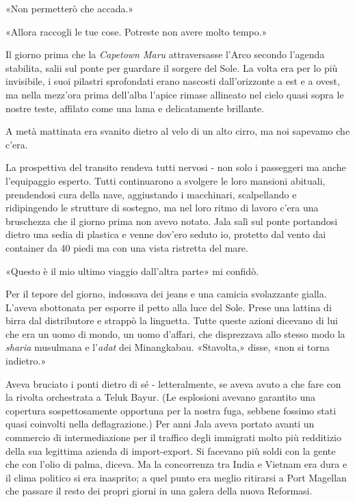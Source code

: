 «Non permetterò che accada.»

«Allora raccogli le tue cose. Potreste non avere molto tempo.»

\separatorefiori

Il giorno prima che la \emph{Capetown Maru} attraversasse l'Arco secondo
l'agenda stabilita, salii sul ponte per guardare il sorgere del Sole. La
volta era per lo più invisibile, i suoi pilastri sprofondati erano
nascosti dall'orizzonte a est e a ovest, ma nella mezz'ora prima
dell'alba l'apice rimase allineato nel cielo quasi sopra le nostre
teste, affilato come una lama e delicatamente brillante.

A metà mattinata era svanito dietro al velo di un alto cirro, ma noi
sapevamo che c'era.

La prospettiva del transito rendeva tutti nervosi - non solo i
passeggeri ma anche l'equipaggio esperto. Tutti continuarono a svolgere
le loro mansioni abituali, prendendosi cura della nave, aggiustando i
macchinari, scalpellando e ridipingendo le strutture di sostegno, ma nel
loro ritmo di lavoro c'era una bruschezza che il giorno prima non avevo
notato. Jala salì sul ponte portandosi dietro una sedia di plastica e
venne dov'ero seduto io, protetto dal vento dai container da 40 piedi ma
con una vista ristretta del mare.

«Questo è il mio ultimo viaggio dall'altra parte» mi confidò.

Per il tepore del giorno, indossava dei jeans e una camicia svolazzante
gialla. L'aveva sbottonata per esporre il petto alla luce del Sole.
Prese una lattina di birra dal distributore e strappò la linguetta.
Tutte queste azioni dicevano di lui che era un uomo di mondo, un uomo
d'affari, che disprezzava allo stesso modo la \emph{sharia} musulmana e
l'\emph{adat} dei Minangkabau. «Stavolta,» disse, «non si torna
indietro.»

Aveva bruciato i ponti dietro di sé - letteralmente, se aveva avuto a
che fare con la rivolta orchestrata a Teluk Bayur. (Le esplosioni
avevano garantito una copertura sospettosamente opportuna per la nostra
fuga, sebbene fossimo stati quasi coinvolti nella deflagrazione.) Per
anni Jala aveva portato avanti un commercio di intermediazione per il
traffico degli immigrati molto più redditizio della sua legittima
azienda di import-export. Si facevano più soldi con la gente che con
l'olio di palma, diceva. Ma la concorrenza tra India e Vietnam era dura
e il clima politico si era inasprito; a quel punto era meglio ritirarsi
a Port Magellan che passare il resto dei propri giorni in una galera
della nuova Reformasi.

